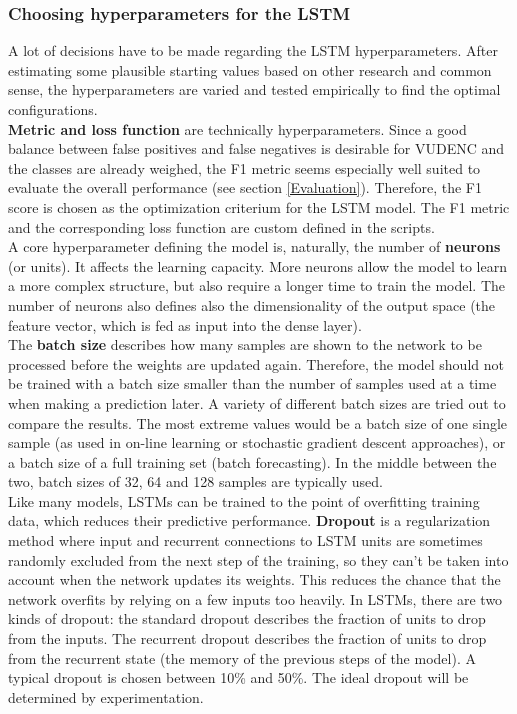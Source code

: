 \documentclass[
	a4paper,
	pagesize,
	pdftex,
	12pt,
	twoside, %
	BCOR=5mm, %
	ngerman,
	fleqn,
	final,
	]{scrartcl}
\begin{document}
\subsubsection{Choosing hyperparameters for the LSTM}
A lot of decisions have to be made regarding the LSTM hyperparameters. After estimating some plausible starting values based on other research and common sense, the hyperparameters are varied and tested empirically to find the optimal configurations.\\
\textbf{Metric and loss function} are technically hyperparameters. Since a good balance between false positives and false negatives is desirable for VUDENC and the classes are already weighed, the F1 metric seems especially well suited to evaluate the overall performance (see section \ref{Evaluation}). Therefore, the F1 score is chosen as the optimization criterium for the LSTM model. The F1 metric and the corresponding loss function are custom defined in the scripts.\\
A core hyperparameter defining the model is, naturally, the number of \textbf{neurons} (or units). It affects the learning capacity. More neurons allow the model to learn a more complex structure, but also require a longer time to train the model. The number of neurons also defines also the dimensionality of the output space (the feature vector, which is fed as input into the dense layer).\\  
The \textbf{batch size} describes how many samples are shown to the network to be processed before the weights are updated again. Therefore, the model should not be trained with a batch size smaller than the number of samples used at a time when making a prediction later. A variety of different batch sizes are tried out to compare the results. The most extreme values would be a batch size of one single sample (as used in on-line learning or stochastic gradient descent approaches), or a batch size of a full training set (batch forecasting). In the middle between the two, batch sizes of 32, 64 and 128 samples are typically used.\\
Like many models, LSTMs can be trained to the point of overfitting training data, which reduces their predictive performance. \textbf{Dropout} is a regularization method where input and recurrent connections to LSTM units are sometimes randomly excluded from the next step of the training, so they can't be taken into account when the network updates its weights. This reduces the chance that the network overfits by relying on a few inputs too heavily. In LSTMs, there are two kinds of dropout: the standard dropout describes the fraction of units to drop from the inputs. The recurrent dropout describes the fraction of units to drop from the recurrent state (the memory of the previous steps of the model). A typical dropout is chosen between 10\% and 50\%. The ideal dropout will be determined by experimentation.\\
\end{document}
